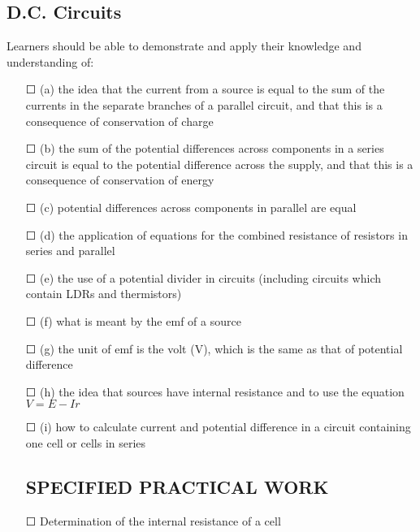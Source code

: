 \subsection{D.C. Circuits}Learners should be able to demonstrate and apply their knowledge and
understanding of:
\begin{itemize}
	\item[\Large{$\Square$}](a) the idea that the current from a source is equal to the sum of the currents in	the separate branches of a parallel circuit, and that \sq this is a consequence of
	conservation of charge
	\item[\Large{$\Square$}]	(b) the sum of the potential differences across components in a series circuit is	equal to the potential difference across the supply, and that \sq this is a	consequence of conservation of energy
	\item[\Large{$\Square$}]	(c) potential differences across components in parallel are equal
	\item[\Large{$\Square$}]	(d) the application of equations for the combined resistance of resistors in \sq series	and \sq parallel
	\item[\Large{$\Square$}]	(e) the use of a potential divider in circuits (including circuits which contain \sq LDRs and \sq thermistors)
	\item[\Large{$\Square$}]	(f) what is meant by the emf of a source
	\item[\Large{$\Square$}]	(g) the unit of emf is the volt (V), which is the same as that of potential difference
	\item[\Large{$\Square$}]	(h) the idea that sources have internal resistance and to use the equation \(V=E-Ir\)
	\item[\Large{$\Square$}]	(i) how to calculate current and potential difference in a circuit containing one cell or cells in series
	\subsection*{SPECIFIED PRACTICAL WORK}
	\item[\Large{$\Square$}] Determination of the internal resistance of a cell
\end{itemize}
